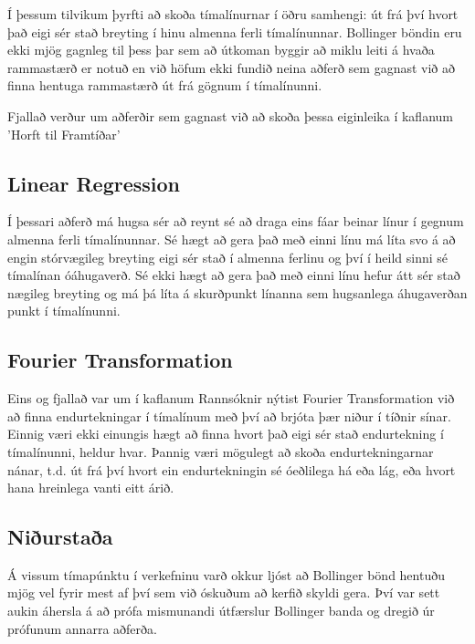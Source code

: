 \documentclass{article}
\begin{document}
Í þessum tilvikum þyrfti að skoða tímalínurnar í öðru samhengi: út frá því hvort
það eigi sér stað breyting í hinu almenna ferli tímalínunnar. Bollinger böndin
eru ekki mjög gagnleg til þess þar sem að útkoman byggir að miklu leiti á hvaða
rammastærð er notuð en við höfum ekki fundið neina aðferð sem gagnast við að
finna hentuga rammastærð út frá gögnum í tímalínunni.

Fjallað verður um aðferðir sem gagnast við að skoða þessa eiginleika í kaflanum
'Horft til Framtíðar'

\subsection{Linear Regression}
Í þessari aðferð má hugsa sér að reynt sé að draga eins fáar beinar línur í
gegnum almenna ferli tímalínunnar. Sé hægt að gera það með einni línu má líta
svo á að engin stórvægileg breyting eigi sér stað í almenna ferlinu og því í
heild sinni sé tímalínan óáhugaverð. Sé ekki hægt að gera það með einni línu
hefur átt sér stað nægileg breyting og má þá líta á skurðpunkt línanna sem
hugsanlega áhugaverðan punkt í tímalínunni.

\subsection{Fourier Transformation}
Eins og fjallað var um í kaflanum Rannsóknir nýtist Fourier
Transformation við að finna endurtekningar í tímalínum með því að brjóta þær
niður í tíðnir sínar.  
Einnig væri ekki einungis hægt að finna hvort það eigi sér stað endurtekning í
tímalínunni, heldur hvar. Þannig væri mögulegt að skoða endurtekningarnar nánar,
t.d. út frá því hvort ein endurtekningin sé óeðlilega há eða lág, eða hvort hana
hreinlega vanti eitt árið.


\subsection{Niðurstaða}
Á vissum tímapúnktu í verkefninu varð okkur ljóst að Bollinger bönd hentuðu
mjög vel fyrir mest af því sem við óskuðum að kerfið skyldi gera.
Því var sett aukin áhersla á að prófa mismunandi útfærslur Bollinger banda og
dregið
úr prófunum annarra aðferða.

\hfil \\
\hfil \\
\hfil \\
\hfil \\
\end{document}
